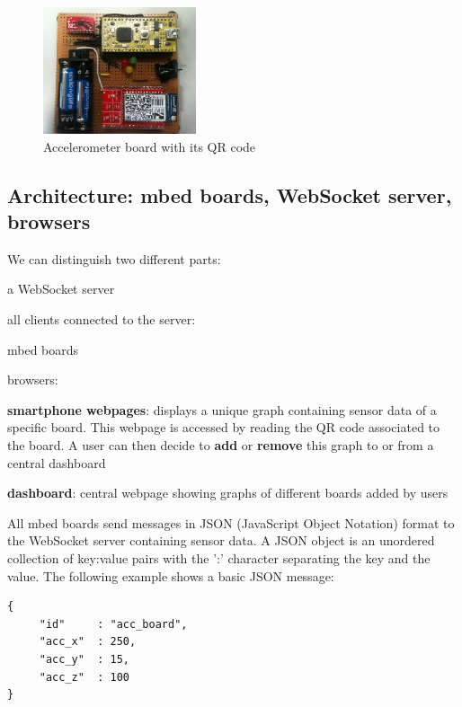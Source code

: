 \documentclass[pdftex,10pt,a4paper]{report}
\newenvironment{packed_item}{
\begin{itemize}
  \setlength{\itemsep}{1pt}
  \setlength{\parskip}{0pt}
  \setlength{\parsep}{0pt}
}{\end{itemize}}
\begin{document}
\begin{figure}[h!]
		\centering
		\includegraphics[width=0.4\textwidth]{./acc_board.jpg}
		\caption{Accelerometer board with its QR code}
		\label{Accelerometer board with its QR code}
\end{figure}



\subsection{Architecture: mbed boards, WebSocket server, browsers}
We can distinguish two different parts:
\begin{packed_item}
	\item a WebSocket server
	\item all clients connected to the server:
	\begin{packed_item}
		\item mbed boards
		\item browsers:
		\begin{packed_item}
			\item \textbf{smartphone webpages}: displays a unique graph containing sensor data of a specific board. This webpage is accessed by reading the QR code associated to the board. A user can then decide to \textbf{add} or \textbf{remove} this graph to or from a central dashboard
			\item \textbf{dashboard}: central webpage showing graphs of different boards added by users
		\end{packed_item}
	\end{packed_item}
\end{packed_item}

All mbed boards send messages in JSON (JavaScript Object Notation) format to the WebSocket server containing sensor data. A JSON object is an unordered collection of key:value pairs with the ':' character separating the key and the value. The following example shows a basic JSON message:
\begin{lstlisting}[label=JSON message example,caption=JSON message example]
{
     "id"     : "acc_board",
     "acc_x"  : 250,
     "acc_y"  : 15,
     "acc_z"  : 100
}
\end{lstlisting}
\end{document}
